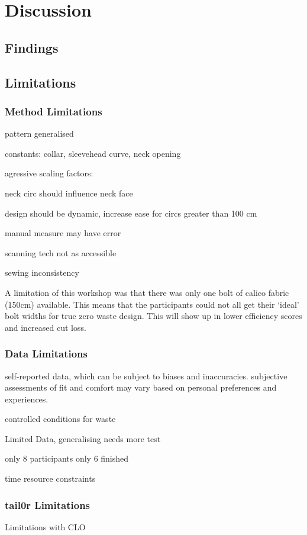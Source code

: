 \chapter{Discussion}

\section{Findings}

\section{Limitations}

\subsection{Method Limitations}
pattern generalised

constants: collar, sleevehead curve, neck opening

agressive scaling factors:

neck circ should influence neck face

design should be dynamic, increase ease for circs greater than 100 cm

manual measure may have error

scanning tech not as accessible

sewing inconsistency

A limitation of this workshop was that there was only one bolt of calico fabric (150cm) available. This means that the participants could not all get their ‘ideal’ bolt widths for true zero waste design. This will show up in lower efficiency scores and increased cut loss.

\subsection{Data Limitations}
self-reported data, which can be subject to biases and inaccuracies. subjective assessments of fit and comfort may vary based on personal preferences and experiences. 

controlled conditions for waste

Limited Data, generalising needs more test

only 8 participants only 6 finished

time resource constraints

\subsection{tail0r Limitations}
Limitations with CLO


